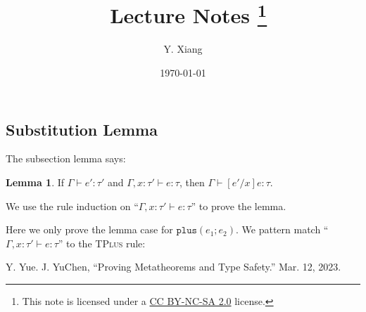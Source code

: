 \documentclass{article}
\title{\vspace{-3em}\course\, Lecture Notes \asnum\footnote{This note is licensed under a \href{https://creativecommons.org/licenses/by-nc-sa/2.0/}{CC BY-NC-SA 2.0} license.}}
\author{Y. Xiang\vspace{1em}}
\date{\today\vspace{-1em}}
\theoremstyle{definition}
\newtheorem*{lemma}{Lemma}
\begin{document}
\maketitle

\subsection{Substitution Lemma}

The subsection lemma says:
\begin{lemma}
    If $\Gamma \vdash e':\tau'$ and $\Gamma, x:\tau'\vdash e:\tau$, then $\Gamma \vdash [e'/x]e:\tau$.
\end{lemma}

We use the rule induction on ``$\Gamma, x:\tau'\vdash e:\tau$'' to prove the lemma.

Here we only prove the lemma case for $\mathtt{plus}(e_1;e_2)$.
We pattern match ``$\Gamma, x:\tau'\vdash e:\tau$'' to the \textsc{TPlus} rule:
\begin{mathpar}
\end{mathpar}

\begin{thebibliography}{9}
     Y. Yue. J. YuChen, “Proving Metatheorems and Type Safety.” Mar. 12, 2023.
\end{thebibliography}
\end{document}
